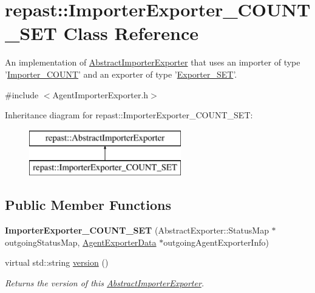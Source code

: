 \hypertarget{classrepast_1_1_importer_exporter___c_o_u_n_t___s_e_t}{\section{repast\-:\-:Importer\-Exporter\-\_\-\-C\-O\-U\-N\-T\-\_\-\-S\-E\-T Class Reference}
\label{classrepast_1_1_importer_exporter___c_o_u_n_t___s_e_t}
}


An implementation of \hyperlink{classrepast_1_1_abstract_importer_exporter}{Abstract\-Importer\-Exporter} that uses an importer of type '\hyperlink{classrepast_1_1_importer___c_o_u_n_t}{Importer\-\_\-\-C\-O\-U\-N\-T}' and an exporter of type '\hyperlink{classrepast_1_1_exporter___s_e_t}{Exporter\-\_\-\-S\-E\-T}'.  




{\ttfamily \#include $<$Agent\-Importer\-Exporter.\-h$>$}

Inheritance diagram for repast\-:\-:Importer\-Exporter\-\_\-\-C\-O\-U\-N\-T\-\_\-\-S\-E\-T\-:\begin{figure}[H]
\begin{center}
\leavevmode
\includegraphics[height=2.000000cm]{classrepast_1_1_importer_exporter___c_o_u_n_t___s_e_t}
\end{center}
\end{figure}
\subsection*{Public Member Functions}
\begin{DoxyCompactItemize}
\item 
\hypertarget{classrepast_1_1_importer_exporter___c_o_u_n_t___s_e_t_a03c9be6ac0338a286aad918f8ee7ca1e}{{\bfseries Importer\-Exporter\-\_\-\-C\-O\-U\-N\-T\-\_\-\-S\-E\-T} (Abstract\-Exporter\-::\-Status\-Map $\ast$outgoing\-Status\-Map, \hyperlink{classrepast_1_1_agent_exporter_data}{Agent\-Exporter\-Data} $\ast$outgoing\-Agent\-Exporter\-Info)}\label{classrepast_1_1_importer_exporter___c_o_u_n_t___s_e_t_a03c9be6ac0338a286aad918f8ee7ca1e}

\item 
virtual std\-::string \hyperlink{classrepast_1_1_importer_exporter___c_o_u_n_t___s_e_t_a4feec2dc77e01798f1331381198ce3e7}{version} ()
\begin{DoxyCompactList}\small\item\em Returns the version of this \hyperlink{classrepast_1_1_abstract_importer_exporter}{Abstract\-Importer\-Exporter}. \end{DoxyCompactList}\end{DoxyCompactItemize}
